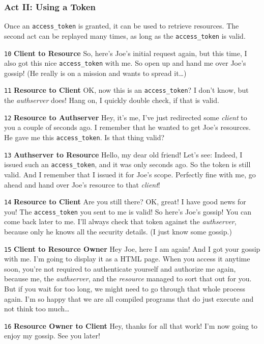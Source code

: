 \subsubsection{Act II: Using a Token}

Once an \texttt{access\_token} is granted, it can be used to retrieve resources. The second act can be replayed many times, as long as the \texttt{access\_token} is valid.

\begin{description}
    \item \texttt{10} \textbf{Client to Resource} So, here's Joe's initial request again, but this time, I also got this nice \texttt{access\_token} with me. So open up and hand me over Joe's gossip! (He really is on a mission and wants to spread it…)
    \item \texttt{11} \textbf{Resource to Client} OK, now this is an \texttt{access\_token}? I don't know, but the \textit{authserver} does! Hang on, I quickly double check, if that is valid.
    \item \texttt{12} \textbf{Resource to Authserver} Hey, it's me, I've just redirected some \textit{client} to you a couple of seconds ago. I remember that he wanted to get Joe's resources. He gave me this \texttt{access\_token}. Is that thing valid?
    \item \texttt{13} \textbf{Authserver to Resource} Hello, my dear old friend! Let's see: Indeed, I issued such an \texttt{access\_\-token}, and it was only seconds ago. So the token is still valid. And I remember that I issued it for Joe's scope. Perfectly fine with me, go ahead and hand over Joe's resource to that \textit{client}!
    \item \texttt{14} \textbf{Resource to Client} Are you still there? OK, great! I have good news for you! The \texttt{access\_token} you sent to me is valid! So here's Joe's gossip! You can come back later to me. I'll always check that token against the \textit{authserver}, because only he knows all the security details. (I just know some gossip.)
    \item \texttt{15} \textbf{Client to Resource Owner} Hey Joe, here I am again! And I got your gossip with me. I'm going to display it as a HTML page. When you access it anytime soon, you're not required to authenticate yourself and authorize me again, because me, the \textit{authserver}, and the \textit{resource} managed to sort that out for you. But if you wait for too long, we might need to go through that whole process again. I'm so happy that we are all compiled programs that do just execute and not think too much…
    \item \texttt{16} \textbf{Resource Owner to Client} Hey, thanks for all that work! I'm now going to enjoy my gossip. See you later!
\end{description}
